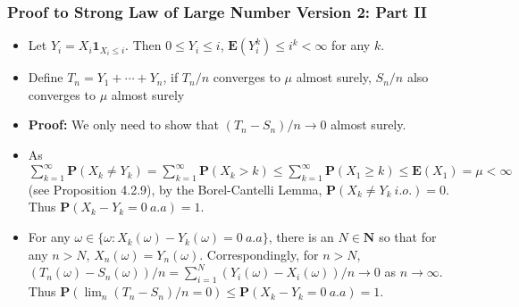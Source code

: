 \documentclass[handout]{beamer}
\newcommand{\BP}{\mathbf{P}}
\newcommand{\BE}{\mathbf{E}}
\newcommand{\BI}{\mathbf{1}}
\begin{document}
\frame
{
  \frametitle{Proof to Strong Law of Large Number Version 2: Part II}

   \begin{itemize}
   \item<1-> Let $Y_i=X_i \BI_{X_i\leq i}$. Then $0\leq Y_i \leq i$, $\BE(Y_i^k) \leq i^k< \infty$ for any $k$.
   
    \item<2->[]\begin{Lemma} Define $T_n=Y_1+\cdots+Y_n$, if $T_n/n$ converges to $\mu$ almost surely, $S_n/n$ also converges to $\mu$ almost surely \end{Lemma} 
    
    \item<3-> \textbf{Proof:} We only need to show that $(T_n-S_n)/n \rightarrow 0$ almost surely. 
    
         \item<4->[-]  As $\sum_{k=1}^{\infty} \BP(X_k\neq Y_k)=\sum_{k=1}^{\infty} \BP (X_k>k) \leq \sum_{k=1}^{\infty} \BP (X_1\geq k)\leq \BE(X_1)=\mu<\infty$ (see Proposition 4.2.9), by the Borel-Cantelli Lemma, $\BP(X_k\neq Y_k\ i.o.)=0$. Thus $\BP(X_k-Y_k=0\ a.a)=1$.
         
         \item<5->[-]   For any $\omega\in \{\omega: X_k(\omega)-Y_k(\omega)=0\ a.a \}$, there is an $N \in \mathbf{N}$ so that for any $n>N$, $X_n(\omega)=Y_n(\omega)$. Correspondingly, for $n>N$, $(T_n(\omega)-S_n(\omega))/n=\sum_{i=1}^N (Y_i(\omega)-X_i (\omega) )/n \rightarrow 0$ as $n\rightarrow \infty$.  Thus $\BP (\lim_n (T_n-S_n)/n=0)\leq \BP(X_k-Y_k=0\ a.a)=1$.
                                      
\end{itemize}
}
\end{document}
